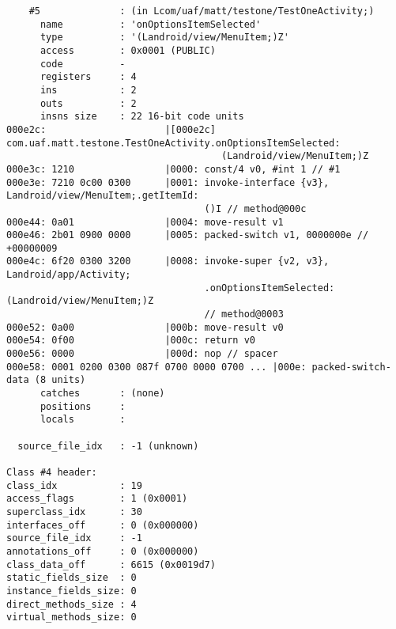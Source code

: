 \begin{lstlisting}
    #5              : (in Lcom/uaf/matt/testone/TestOneActivity;)
      name          : 'onOptionsItemSelected'
      type          : '(Landroid/view/MenuItem;)Z'
      access        : 0x0001 (PUBLIC)
      code          -
      registers     : 4
      ins           : 2
      outs          : 2
      insns size    : 22 16-bit code units
000e2c:                     |[000e2c] com.uaf.matt.testone.TestOneActivity.onOptionsItemSelected:
                                      (Landroid/view/MenuItem;)Z
000e3c: 1210                |0000: const/4 v0, #int 1 // #1
000e3e: 7210 0c00 0300      |0001: invoke-interface {v3}, Landroid/view/MenuItem;.getItemId:
                                   ()I // method@000c
000e44: 0a01                |0004: move-result v1
000e46: 2b01 0900 0000      |0005: packed-switch v1, 0000000e // +00000009
000e4c: 6f20 0300 3200      |0008: invoke-super {v2, v3}, Landroid/app/Activity;
                                   .onOptionsItemSelected:(Landroid/view/MenuItem;)Z
                                   // method@0003
000e52: 0a00                |000b: move-result v0
000e54: 0f00                |000c: return v0
000e56: 0000                |000d: nop // spacer
000e58: 0001 0200 0300 087f 0700 0000 0700 ... |000e: packed-switch-data (8 units)
      catches       : (none)
      positions     :
      locals        :

  source_file_idx   : -1 (unknown)

Class #4 header:
class_idx           : 19
access_flags        : 1 (0x0001)
superclass_idx      : 30
interfaces_off      : 0 (0x000000)
source_file_idx     : -1
annotations_off     : 0 (0x000000)
class_data_off      : 6615 (0x0019d7)
static_fields_size  : 0
instance_fields_size: 0
direct_methods_size : 4
virtual_methods_size: 0


\end{lstlisting}
